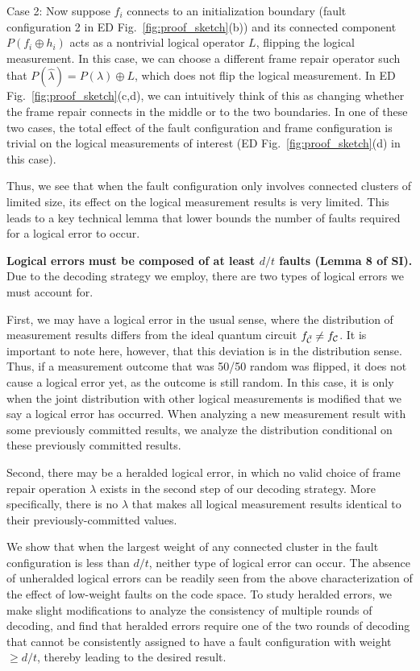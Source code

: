 Case 2: Now suppose $f_i$ connects to an initialization boundary (fault configuration 2 in ED Fig.~\ref{fig:proof_sketch}(b)) and its connected component $P(f_i\oplus h_i)$ acts as a nontrivial logical operator $L$, flipping the logical measurement.
%
In this case, we can choose a different frame repair operator such that $P(\hat{\lambda})=P(\lambda)\oplus L$, which does not flip the logical measurement.
%
In ED Fig.~\ref{fig:proof_sketch}(c,d), we can intuitively think of this as changing whether the frame repair connects in the middle or to the two boundaries.
%
In one of these two cases, the total effect of the fault configuration and frame configuration is trivial on the logical measurements of interest (ED Fig.~\ref{fig:proof_sketch}(d) in this case).

Thus, we see that when the fault configuration only involves connected clusters of limited size, its effect on the logical measurement results is very limited.
%
This leads to a key technical lemma that lower bounds the number of faults required for a logical error to occur.

\textbf{Logical errors must be composed of at least $d/t$ faults (Lemma 8 of SI).}
%
Due to the decoding strategy we employ, there are two types of logical errors we must account for.

First, we may have a logical error in the usual sense, where the distribution of measurement results differs from the ideal quantum circuit $f_{\tilde{\mathcal{C}}}\neq f_{\mathcal{C}}$.
%
It is important to note here, however, that this deviation is in the distribution sense.
%
Thus, if a measurement outcome that was 50/50 random was flipped, it does not cause a logical error yet, as the outcome is still random.
%
In this case, it is only when the joint distribution with other logical measurements is modified that we say a logical error has occurred.
%
When analyzing a new measurement result with some previously committed results, we analyze the distribution conditional on these previously committed results.

Second, there may be a heralded logical error, in which no valid choice of frame repair operation $\lambda$ exists in the second step of our decoding strategy.
%
More specifically, there is no $\lambda$ that makes all logical measurement results identical to their previously-committed values.

We show that when the largest weight of any connected cluster in the fault configuration is less than $d/t$, neither type of logical error can occur.
%
The absence of unheralded logical errors can be readily seen from the above characterization of the effect of low-weight faults on the code space.
%
To study heralded errors, we make slight modifications to analyze the consistency of multiple rounds of decoding, and find that heralded errors require one of the two rounds of decoding that cannot be consistently assigned to have a fault configuration with weight $\geq d/t$, thereby leading to the desired result.

